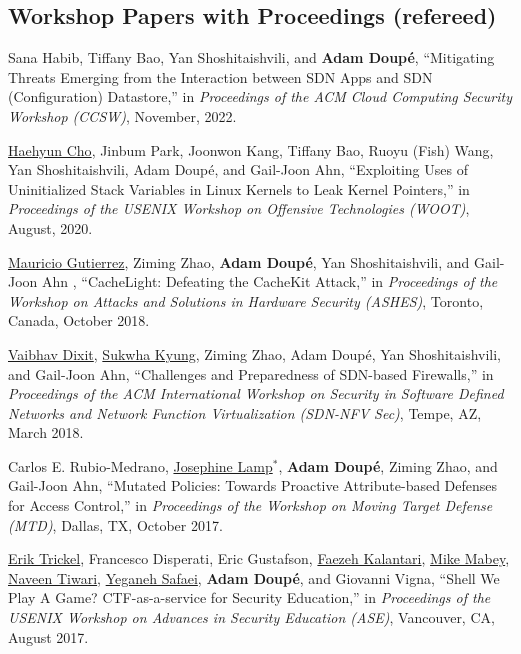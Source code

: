 \documentclass[11pt,letterpaper,sans]{moderncv}
\begin{document}
\subsection{Workshop Papers with Proceedings (refereed)}

\begin{etaremune}

\item Sana Habib,  Tiffany Bao,  Yan Shoshitaishvili, and  \textbf{Adam Doup\'e}, ``Mitigating Threats Emerging from the Interaction between SDN Apps and SDN (Configuration) Datastore,'' in \emph{Proceedings of the ACM Cloud Computing Security Workshop (CCSW)}, November, 2022.

\item \underline{Haehyun Cho}, Jinbum Park, Joonwon Kang, Tiffany Bao, Ruoyu (Fish) Wang, Yan Shoshitaishvili, Adam Doup\'e, and Gail-Joon Ahn, ``Exploiting Uses of Uninitialized Stack Variables in Linux Kernels to Leak Kernel Pointers,'' in \emph{Proceedings of the USENIX Workshop on Offensive Technologies (WOOT)}, August, 2020.

\item \underline{Mauricio Gutierrez}, Ziming Zhao, \textbf{Adam Doup\'e}, Yan Shoshitaishvili, and Gail-Joon Ahn , ``CacheLight: Defeating the CacheKit Attack,'' in \emph{Proceedings of the Workshop on Attacks and Solutions in Hardware Security (ASHES)}, Toronto, Canada, October 2018.

\item \underline{Vaibhav Dixit}, \underline{Sukwha Kyung}, Ziming
  Zhao, Adam Doupé, Yan Shoshitaishvili, and Gail-Joon Ahn,
  ``Challenges and Preparedness of SDN-based Firewalls,'' in
  \emph{Proceedings of the ACM International Workshop on Security in
    Software Defined Networks and Network Function Virtualization
    (SDN-NFV Sec)}, Tempe, AZ, March 2018.

\item Carlos E. Rubio-Medrano, \underline{Josephine Lamp}$^*$, \textbf{Adam
  Doup\'e}, Ziming Zhao, and Gail-Joon Ahn, ``Mutated Policies: Towards
  Proactive Attribute-based Defenses for Access Control,'' in
  \emph{Proceedings of the Workshop on Moving Target Defense (MTD)},
  Dallas, TX, October 2017.

\item \underline{Erik Trickel}, Francesco Disperati, Eric Gustafson,
  \underline{Faezeh Kalantari}, \underline{Mike Mabey},
  \underline{Naveen Tiwari}, \underline{Yeganeh Safaei}, \textbf{Adam
    Doup\'e}, and Giovanni Vigna, ``Shell We Play A Game?
  CTF-as-a-service for Security Education,'' in \emph{Proceedings of
    the USENIX Workshop on Advances in Security Education (ASE)},
  Vancouver, CA, August 2017.


\end{etaremune}
\end{document}
